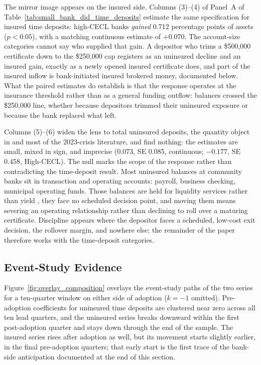 The mirror image appears on the insured side.  Columns (3)--(4) of
Panel~A of Table~\ref{tab:small_bank_did_time_deposits} estimate the same
specification for insured time deposits: high-CECL banks \emph{gained}
0.712 percentage points of assets ($p<0.05$), with a matching
continuous estimate of $+0.070$.  The account-size categories cannot
say who supplied that gain.  A depositor who trims a \$500{,}000
certificate down to the \$250{,}000 cap registers as an uninsured
decline and an insured gain, exactly as a newly opened insured
certificate does, and part of the insured inflow is bank-initiated
insured brokered money, documented below.  What the paired
estimates do establish is that the response operates at the insurance
threshold rather than as a general funding outflow: balances crossed
the \$250{,}000 line, whether because depositors trimmed their
uninsured exposure or because the bank replaced what left.

Columns (5)--(6) widen the lens to total uninsured deposits, the
quantity object in \citet{huberdeau2025adverse} and most of the
2023-crisis literature, and find nothing: the estimates are small,
mixed in sign, and imprecise (0.073, SE 0.085, continuous; $-0.177$,
SE 0.458, High-CECL).  The null marks the scope of the response
rather than contradicting the time-deposit result.  Most uninsured
balances at community banks sit in transaction and operating
accounts: payroll, business checking, municipal operating funds.
Those balances are held for liquidity services rather than yield
\citep{davernas2023deposit}, they face no scheduled decision point,
and moving them means severing an operating relationship rather than
declining to roll over a maturing certificate.  Discipline appears
where the depositor faces a scheduled, low-cost exit decision, the
rollover margin, and nowhere else; the remainder of the paper
therefore works with the time-deposit categories.

\subsection{Event-Study Evidence}
\label{sec:results:eventstudy}

Figure~\ref{fig:overlay_composition} overlays the event-study paths of
the two series for a ten-quarter window on either side of adoption
($k=-1$ omitted).  Pre-adoption coefficients for uninsured time
deposits are clustered near zero across all ten lead quarters, and the
uninsured series breaks downward within the first post-adoption quarter
and stays down through the end of the sample.  The insured series rises
after adoption as well, but its movement starts slightly earlier, in
the final pre-adoption quarters; that early start is the first trace of
the bank-side anticipation documented at the end of this section.

